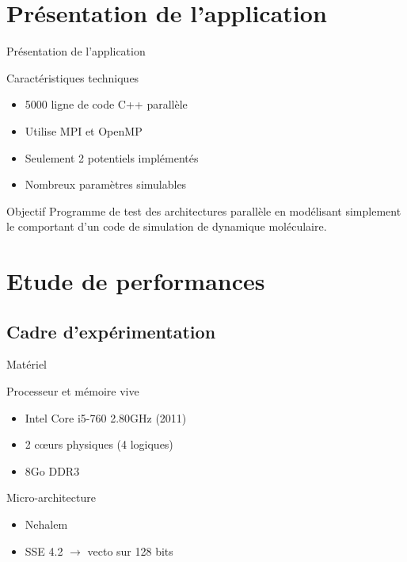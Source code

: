 \documentclass[9.5pt]{beamer}
\begin{document}
\section{Présentation de l'application}
	\begin{frame}{Présentation de l'application}
		\begin{block}{Caractéristiques techniques}
			\begin{itemize}
				\item 5000 ligne de code C++ parallèle
				\item Utilise MPI et OpenMP
				\item Seulement 2 potentiels implémentés
				\item Nombreux paramètres simulables
			\end{itemize}
		\end{block}

		\begin{block}{Objectif}
			Programme de test des architectures parallèle en modélisant simplement le comportant d'un code de simulation de dynamique moléculaire.
		\end{block}
	\end{frame}

\section{Etude de performances}
	\subsection{Cadre d'expérimentation}
		\begin{frame}{Matériel}
			\begin{block}{Processeur et mémoire vive}
				\begin{itemize}
					\item Intel Core i5-760 2.80GHz (2011)
					\item 2 c\oe{}urs physiques (4 logiques)
					\item 8Go DDR3
				\end{itemize}
			\end{block}

			\begin{block}{Micro-architecture}
				\begin{itemize}
					\item Nehalem
					\item SSE 4.2 $\rightarrow$ vecto sur 128 bits
				\end{itemize}
			\end{block}
		\end{frame}
\end{document}
